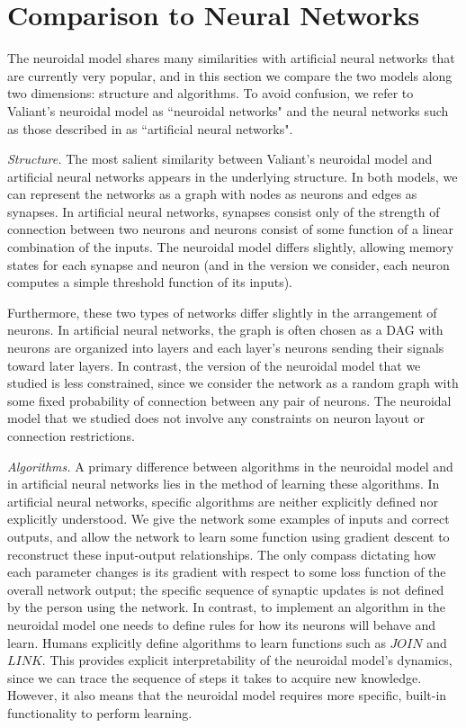 \documentclass[letterpaper, 12pt]{article}
\begin{document}
\section{Comparison to Neural Networks}
The neuroidal model shares many similarities with artificial neural networks that are currently very popular, and in this section we compare the two models along two dimensions: structure and algorithms. To avoid confusion, we refer to Valiant's neuroidal model as ``neuroidal networks" and the neural networks such as those described in \cite{nielsen_neural_2015} as ``artificial neural networks". 

{\it Structure.}  The most salient similarity between Valiant's neuroidal model and artificial neural networks appears in the underlying structure. In both models, we can represent the networks as a graph with nodes as neurons and edges as synapses. In artificial neural networks, synapses consist only of the strength of connection between two neurons and neurons consist of some function of a linear combination of the inputs. The neuroidal model differs slightly, allowing memory states for each synapse and neuron (and in the version we consider, each neuron computes a simple threshold function of its inputs).

Furthermore, these two types of networks differ slightly in the arrangement of neurons. In artificial neural networks, the graph is often chosen as a DAG with neurons are organized into layers and each layer's neurons sending their signals toward later layers. In contrast, the version of the neuroidal model that we studied is less constrained, since we consider the network as a random graph with some fixed probability of connection between any pair of neurons. The neuroidal model that we studied does not involve any constraints on neuron layout or connection restrictions.

{\it Algorithms.} A primary difference between algorithms in the neuroidal model and in artificial neural networks lies in the method of learning these algorithms. In artificial neural networks, specific algorithms are neither explicitly defined nor explicitly understood. We give the network some examples of inputs and correct outputs, and allow the network to learn some function using gradient descent to reconstruct these input-output relationships. The only compass dictating how each parameter changes is its gradient with respect to some loss function of the overall network output; the specific sequence of synaptic updates is not defined by the person using the network. In contrast, to implement an algorithm in the neuroidal model one needs to define rules for how its neurons will behave and learn. Humans explicitly define algorithms to learn functions such as $JOIN$ and $LINK$. This provides explicit interpretability of the neuroidal model's dynamics, since we can trace the sequence of steps it takes to acquire new knowledge. However, it also means that the neuroidal model requires more specific, built-in functionality to perform learning.
\end{document}
